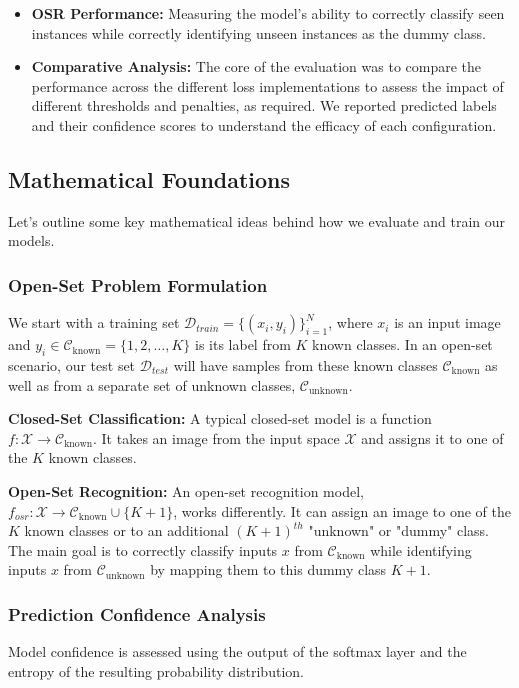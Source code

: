 \documentclass[11pt, a4paper]{article}
\begin{document}
\begin{itemize}
    \item \textbf{OSR Performance:} Measuring the model's ability to correctly classify seen instances while correctly identifying unseen instances as the dummy class.
    \item \textbf{Comparative Analysis:} The core of the evaluation was to compare the performance across the different loss implementations to assess the impact of different thresholds and penalties, as required. We reported predicted labels and their confidence scores to understand the efficacy of each configuration.
\end{itemize}

\subsection{Mathematical Foundations}

Let's outline some key mathematical ideas behind how we evaluate and train our models.

\subsubsection{Open-Set Problem Formulation}
We start with a training set $\mathcal{D}_{train} = \{(x_i, y_i)\}_{i=1}^{N}$, where $x_i$ is an input image and $y_i \in \mathcal{C}_{\text{known}} = \{1, 2, \ldots, K\}$ is its label from $K$ known classes. In an open-set scenario, our test set $\mathcal{D}_{test}$ will have samples from these known classes $\mathcal{C}_{\text{known}}$ as well as from a separate set of unknown classes, $\mathcal{C}_{\text{unknown}}$.

\textbf{Closed-Set Classification:} A typical closed-set model is a function $f: \mathcal{X} \to \mathcal{C}_{\text{known}}$. It takes an image from the input space $\mathcal{X}$ and assigns it to one of the $K$ known classes.

\textbf{Open-Set Recognition:} An open-set recognition model, $f_{osr}: \mathcal{X} \to \mathcal{C}_{\text{known}} \cup \{K+1\}$, works differently. It can assign an image to one of the $K$ known classes or to an additional $(K+1)^{th}$ "unknown" or "dummy" class. The main goal is to correctly classify inputs $x$ from $\mathcal{C}_{\text{known}}$ while identifying inputs $x$ from $\mathcal{C}_{\text{unknown}}$ by mapping them to this dummy class $K+1$.

\subsubsection{Prediction Confidence Analysis}
Model confidence is assessed using the output of the softmax layer and the entropy of the resulting probability distribution.
\end{document}
